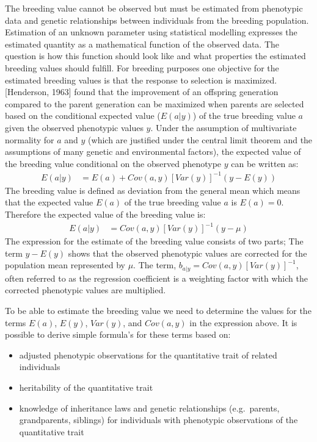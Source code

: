 \documentclass[
]{article}
\providecommand{\tightlist}{%
  \setlength{\itemsep}{0pt}\setlength{\parskip}{0pt}}
\begin{document}
The breeding value cannot be observed but must be estimated from phenotypic data and genetic relationships between individuals from the breeding population. Estimation of an unknown parameter using statistical modelling expresses the estimated quantity as a mathematical function of the observed data. The question is how this function should look like and what properties the estimated breeding values should fulfill. For breeding purposes one objective for the
estimated breeding values is that the response to selection is maximized.
{[}Henderson, 1963{]} found that the improvement of an offspring generation compared to the parent generation can be maximized when parents are selected
based on the conditional expected value (\(E(a|y)\)) of the true breeding value \(a\)
given the observed phenotypic values \(y\). Under the assumption of multivariate
normality for \(a\) and \(y\) (which are justified under the central limit theorem and the assumptions of many genetic and environmental factors), the expected value of the breeding value conditional on the observed phenotype \(y\) can be written as:
\begin{align}
E(a|y) &= E(a) + Cov(a,y)[Var(y)]^{-1}(y-E(y))
\end{align}
The breeding value is defined as deviation from the general mean which means that the expected value \(E(a)\) of the true breeding value \(a\) is \(E(a)=0\). Therefore the expected value of the breeding value is:
\begin{align}
E(a|y) &= Cov(a,y)[Var(y)]^{-1}(y-\mu)
\end{align}
The expression for the estimate of the breeding value consists of two parts;
The term \(y-E(y)\) shows that the observed phenotypic values are corrected for the
population mean represented by \(\mu\). The term, \(b_{a|y}=Cov(a,y)[Var(y)]^{-1}\), often referred to as the regression coefficient is a weighting factor with which the corrected phenotypic values are multiplied.

To be able to estimate the breeding value we need to determine the values for the terms \(E(a)\), \(E(y)\), \(Var(y)\), and \(Cov(a,y)\) in the expression above. It is possible to derive simple formula's for these terms based on:

\begin{itemize}
\tightlist
\item
  adjusted phenotypic observations for the quantitative trait of related individuals
\item
  heritability of the quantitative trait
\item
  knowledge of inheritance laws and genetic relationships (e.g.~parents, grandparents, siblings) for individuals with phenotypic observations of the quantitative trait
\end{itemize}
\end{document}
